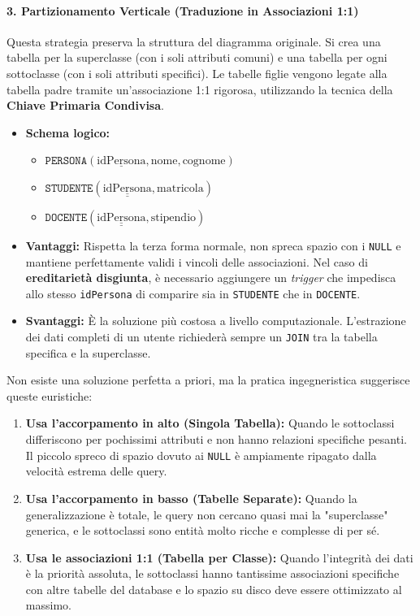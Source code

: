 \paragraph{3. Partizionamento Verticale (Traduzione in Associazioni 1:1)}
Questa strategia preserva la struttura del diagramma originale. Si crea una tabella per la superclasse (con i soli attributi comuni) e una tabella per ogni sottoclasse (con i soli attributi specifici). Le tabelle figlie vengono legate alla tabella padre tramite un'associazione 1:1 rigorosa, utilizzando la tecnica della \textbf{Chiave Primaria Condivisa}.

\begin{itemize}
    \item \textbf{Schema logico:} 
    \begin{itemize}
        \item $\texttt{PERSONA}(\underline{\text{idPersona}}, \text{nome}, \text{cognome})$
        \item $\texttt{STUDENTE}(\underline{\underline{\text{idPersona}}}, \text{matricola})$
        \item $\texttt{DOCENTE}(\underline{\underline{\text{idPersona}}}, \text{stipendio})$
    \end{itemize}
    \item \textbf{Vantaggi:} Rispetta la terza forma normale, non spreca spazio con i \texttt{NULL} e mantiene perfettamente validi i vincoli delle associazioni. Nel caso di \textbf{ereditarietà disgiunta}, è necessario aggiungere un \textit{trigger} che impedisca allo stesso \texttt{idPersona} di comparire sia in \texttt{STUDENTE} che in \texttt{DOCENTE}.
    \item \textbf{Svantaggi:} È la soluzione più costosa a livello computazionale. L'estrazione dei dati completi di un utente richiederà sempre un \texttt{JOIN} tra la tabella specifica e la superclasse.
\end{itemize}

\begin{tip}
Non esiste una soluzione perfetta a priori, ma la pratica ingegneristica suggerisce queste euristiche:
\begin{enumerate}
    \item \textbf{Usa l'accorpamento in alto (Singola Tabella):} Quando le sottoclassi differiscono per pochissimi attributi e non hanno relazioni specifiche pesanti. Il piccolo spreco di spazio dovuto ai \texttt{NULL} è ampiamente ripagato dalla velocità estrema delle query.
    \item \textbf{Usa l'accorpamento in basso (Tabelle Separate):} Quando la generalizzazione è totale, le query non cercano quasi mai la "superclasse" generica, e le sottoclassi sono entità molto ricche e complesse di per sé.
    \item \textbf{Usa le associazioni 1:1 (Tabella per Classe):} Quando l'integrità dei dati è la priorità assoluta, le sottoclassi hanno tantissime associazioni specifiche con altre tabelle del database e lo spazio su disco deve essere ottimizzato al massimo.
\end{enumerate}
\end{tip}

